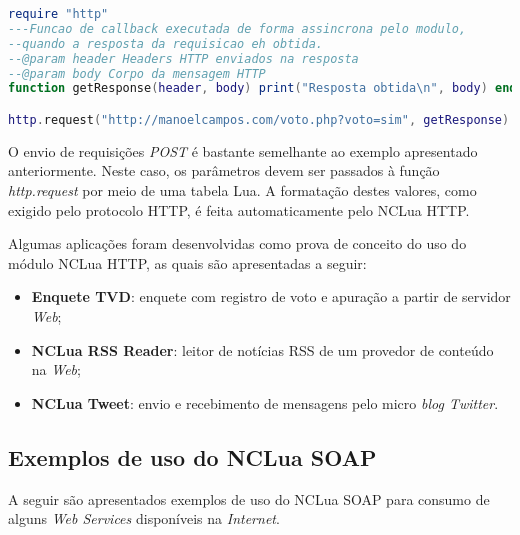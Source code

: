\begin{lstlisting}[caption=Exemplo de envio de requisição GET (contendo parâmetros) com NCLua HTTP, label=list:ncluahttp2, language=lua]
require "http"
---Funcao de callback executada de forma assincrona pelo modulo, 
--quando a resposta da requisicao eh obtida.
--@param header Headers HTTP enviados na resposta
--@param body Corpo da mensagem HTTP
function getResponse(header, body) print("Resposta obtida\n", body) end

http.request("http://manoelcampos.com/voto.php?voto=sim", getResponse)
\end{lstlisting}

O envio de requisições \textit{POST} é bastante semelhante ao exemplo apresentado anteriormente. 
Neste caso, os parâmetros devem ser passados à função \textit{http.request} por meio
de uma tabela Lua. A formatação destes valores, como exigido pelo protocolo HTTP, é feita automaticamente pelo NCLua HTTP.

Algumas aplicações foram desenvolvidas como prova de conceito do uso do módulo NCLua HTTP,
as quais são apresentadas a seguir:

\begin{itemize} 
	\item \textbf{Enquete TVD}: enquete com registro de voto e apuração a partir de servidor \textit{Web};
  \item \textbf{NCLua RSS Reader}: leitor de notícias RSS de um provedor de conteúdo na \textit{Web};
  \item \textbf{NCLua Tweet}: envio e recebimento de mensagens pelo micro \textit{blog Twitter}.
\end{itemize}

\subsection{Exemplos de uso do NCLua SOAP} \label{sec:apps-ncluasoap}

A seguir são apresentados exemplos de uso do NCLua SOAP para consumo de alguns \textit{Web Services}
disponíveis na \textit{Internet}.

